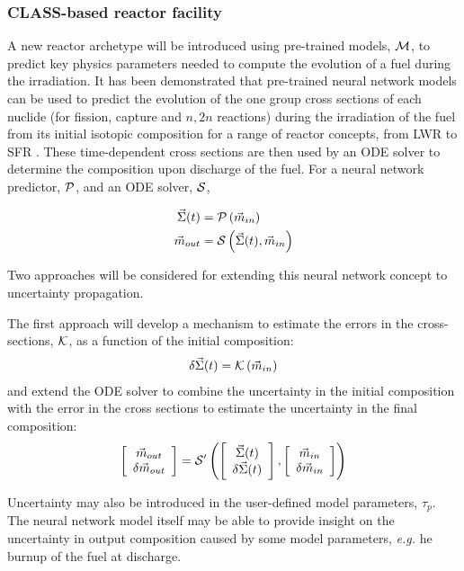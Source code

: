 \documentclass[dvips,12pt]{article}
\newcommand{\uncvector}[1]
{ \left[ \begin{array}{c} #1 \\ \delta #1 \end{array} \right] }
\begin{document}
\subsubsection{CLASS-based reactor facility}

A new reactor archetype will be introduced using
pre-trained models, ${\cal M}$, to predict key
physics parameters needed to compute the evolution
of a fuel during the irradiation. It has been
demonstrated that pre-trained neural network
models can be used to predict the evolution of the
one group cross sections of each nuclide (for
fission, capture and $n,2n$ reactions) during the
irradiation of the fuel from its initial isotopic
composition for a range of reactor concepts, from
LWR to SFR \cite{Leniau.ANE.2015, Leniau.PHYSOR.2016}.
These time-dependent cross sections are then used
by an ODE solver to determine the composition upon
discharge of the fuel.  For a neural network
predictor, ${\cal P}$, and an ODE solver, ${\cal S}$,

\begin{align}
  \vec{\Sigma}(t) &= {\cal P}\left( \vec{m}_{in}\right)\\
  \vec{m}_{out} &= {\cal S}\left( \vec{\Sigma}(t), \vec{m}_{in}\right)
\end{align}

Two approaches will be considered for extending
this neural network concept to uncertainty
propagation.

The first approach will develop a mechanism to
estimate the errors in the cross-sections, 
${\cal K}$, as a function of the initial composition:
\begin{align}
  \delta\vec{\Sigma}(t) = {\cal K}\left( \vec{m}_{in}\right)
\end{align}
and extend the ODE solver to combine the
uncertainty in the initial composition with the
error in the cross sections to estimate the
uncertainty in the final composition:
\begin{align}
  \uncvector{\vec{m}_{out}} = {\cal S^\prime}\left( \uncvector{\vec{\Sigma}(t)}, \uncvector{\vec{m}_{in}}\right)
\end{align}

Uncertainty may also be introduced in the
user-defined model parameters, $\tau_p$.  The
neural network model itself may be able to provide
insight on the uncertainty in output composition
caused by some model parameters, \textit{e.g.} he
burnup of the fuel at discharge.
\end{document}
